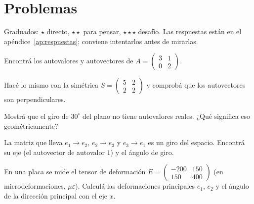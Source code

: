 \section{Problemas}\label{sec:problemas-07}

Graduados: \({\star}\) directo, \({\star}{\star}\) para pensar, \({\star}{\star}{\star}\) desafío. Las respuestas están en el apéndice~\ref{ap:respuestas}; conviene intentarlos antes de mirarlas.

\begin{problema}[\({\star}\)]\label{pb:07-1}
Encontrá los autovalores y autovectores de \(A=\begin{pmatrix}3&1\\0&2\end{pmatrix}\).
\end{problema}

\begin{problema}[\({\star}{\star}\)]\label{pb:07-2}
Hacé lo mismo con la simétrica \(S=\begin{pmatrix}5&2\\2&2\end{pmatrix}\) y comprobá que los autovectores son perpendiculares.
\end{problema}

\begin{problema}[\({\star}{\star}\)]\label{pb:07-3}
Mostrá que el giro de \(30^\circ\) del plano no tiene autovalores reales. ¿Qué significa eso geométricamente?
\end{problema}

\begin{problema}[\({\star}{\star}\)]\label{pb:07-4}
La matriz que lleva \(e_1\to e_2\), \(e_2\to e_3\) y \(e_3\to e_1\) es un giro del espacio. Encontrá su eje (el autovector de autovalor \(1\)) y el ángulo de giro.
\end{problema}

\begin{problema}[\({\star}{\star}{\star}\)]\label{pb:07-5}
En una placa se mide el tensor de deformación \(E=\begin{pmatrix}-200&150\\150&400\end{pmatrix}\) (en microdeformaciones, \(\mu\varepsilon\)). Calculá las deformaciones principales \(e_1\), \(e_2\) y el ángulo de la dirección principal con el eje \(x\).
\end{problema}

